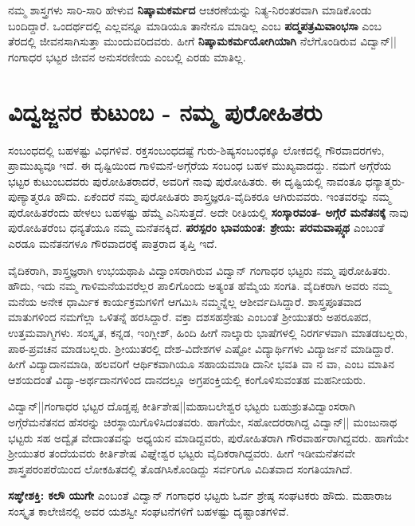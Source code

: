 ನಮ್ಮ ಶಾಸ್ತ್ರಗಳು ಸಾರಿ-ಸಾರಿ ಹೇಳುವ \textbf{ನಿಷ್ಕಾಮಕರ್ಮದ} ಆಚರಣೆಯನ್ನು ನಿತ್ಯ-ನಿರಂತರವಾಗಿ ಮಾಡಿಕೊಂಡು ಬಂದಿದ್ದಾರೆ. ಒಂದರ್ಥದಲ್ಲಿ ಎಲ್ಲವನ್ನೂ ಮಾಡಿಯೂ ತಾನೇನೂ ಮಾಡಿಲ್ಲ ಎಂಬ \textbf{ಪದ್ಮಪತ್ರಮಿವಾಂಭಸಾ} ಎಂಬ ತೆರದಲ್ಲಿ ಜೀವನಸಾಗಿಸುತ್ತಾ ಮುಂದುವರಿದವರು. ಹೀಗೆ \textbf{ನಿಷ್ಕಾಮಕರ್ಮಯೋಗಿಯಾಗಿ} ನೆಲೆಗೊಂಡಿರುವ ವಿದ್ವಾನ್||ಗಂಗಾಧರ ಭಟ್ಟರ ಜೀವನ ಅನುಸರಣೀಯ ಎಂಬಲ್ಲಿ ಎರಡು ಮಾತಿಲ್ಲ.

\section*{ವಿದ್ವಜ್ಜನರ ಕುಟುಂಬ - ನಮ್ಮ ಪುರೋಹಿತರು}

ಸಂಬಂಧದಲ್ಲಿ ಬಹಳಷ್ಟು ವಿಧಗಳಿವೆ. ರಕ್ತಸಂಬಂಧದಷ್ಟೆ ಗುರು-ಶಿಷ್ಯಸಂಬಂಧಕ್ಕೂ ಲೋಕದಲ್ಲಿ ಗೌರವಾದರಗಳು, ಪ್ರಾಮುಖ್ಯವೂ ಇದೆ. ಈ ದೃಷ್ಟಿಯಿಂದ ಗಾಳಿಮನೆ-ಅಗ್ಗೆರೆಯ ಸಂಬಂಧ ಬಹಳ ಮುಖ್ಯವಾದದ್ದು.  ನಮಗೆ ಅಗ್ಗೆರೆಯ ಭಟ್ಟರ ಕುಟುಂಬದವರು ಪುರೋಹಿತರಾದರೆ, ಅವರಿಗೆ ನಾವು ಪುರೋಹಿತರು. ಈ ದೃಷ್ಟಿಯಲ್ಲಿ ನಾವಂತೂ ಧನ್ಯಾತ್ಮರು-ಪುಣ್ಯಾತ್ಮರೂ ಹೌದು. ಏಕೆಂದರೆ ನಮ್ಮ ಪುರೋಹಿತರು ಶಾಸ್ತ್ರಜ್ಞರೂ-ವೈದಿಕರೂ ಆಗಿರುವವರು. ಇಂತವರನ್ನು ನಮ್ಮ ಪುರೋಹಿತರೆಂದು ಹೇಳಲು ಬಹಳಷ್ಟು ಹೆಮ್ಮೆ ಎನಿಸುತ್ತದೆ. ಅದೇ ರೀತಿಯಲ್ಲಿ \textbf{ಸಂಸ್ಕಾರವಂತ- ಅಗ್ಗೆರೆ ಮನೆತನಕ್ಕೆ} ನಾವು ಪುರೋಹಿತರೆಂಬ ಧನ್ಯತೆಯೂ ನಮ್ಮ ಮನೆತನಕ್ಕಿದೆ. \textbf{ಪರಸ್ಪರಂ ಭಾವಯಂತ: ಶ್ರೇಯ: ಪರಮವಾಪ್ಸ್ಯಥ}  ಎಂಬಂತೆ ಎರಡೂ ಮನೆತನಗಳೂ ಗೌರವಾದರಕ್ಕೆ ಪಾತ್ರರಾದ ತೃಪ್ತಿ ಇದೆ. 

ವೈದಿಕರಾಗಿ, ಶಾಸ್ತ್ರಜ್ಞರಾಗಿ ಉಭಯಥಾಪಿ ವಿದ್ವಾಂಸರಾಗಿರುವ ವಿದ್ವಾನ್ ಗಂಗಾಧರ ಭಟ್ಟರು ನಮ್ಮ ಪುರೋಹಿತರು. ಹೌದು, ಇದು ನಮ್ಮ ಗಾಳಿಮನೆಯವರೆಲ್ಲರ ಪಾಲಿಗೊಂದು ಅತ್ಯಂತ ಹೆಮ್ಮೆಯ ಸಂಗತಿ. ವೈದಿಕರಾಗಿ ಅವರು ನಮ್ಮ ಮನೆಯ ಅನೇಕ ಧಾರ್ಮಿಕ ಕಾರ್ಯಕ್ರಮಗಳಿಗೆ ಆಗಮಿಸಿ ನಮ್ಮನ್ನೆಲ್ಲ ಆಶೀರ್ವದಿಸಿದ್ದಾರೆ. ಶಾಸ್ತ್ರಪೂತವಾದ ಮಾತುಗಳಿಂದ ನಮಗೆಲ್ಲಾ ಒಳಿತನ್ನೆ ಹರಸಿದ್ದಾರೆ. ವಕ್ತಾ ದಶಸಹಸ್ರೇಷು ಎಂಬಂತೆ ಶ್ರೀಯುತರು ಅಪರೂಪದ, ಉತ್ತಮವಾಗ್ಮಿಗಳು. ಸಂಸ್ಕೃತ, ಕನ್ನಡ, ಇಂಗ್ಲೀಶ್, ಹಿಂದಿ ಹೀಗೆ ನಾಲ್ಕಾರು ಭಾಷೆಗಳಲ್ಲಿ ನಿರರ್ಗಳವಾಗಿ ಮಾತಡಬಲ್ಲರು, ಪಾಠ-ಪ್ರವಚನ ಮಾಡಬಲ್ಲರು. ಶ್ರೀಯುತರಲ್ಲಿ ದೇಶ-ವಿದೇಶಗಳ ಎಷ್ಟೋ ವಿದ್ಯಾರ್ಥಿಗಳು ವಿದ್ಯಾರ್ಜನೆ ಮಾಡಿದ್ದಾರೆ. ಹೀಗೆ ವಿದ್ಯಾದಾನಮಾಡಿ, ಹಲವರಿಗೆ ಆರ್ಥಿಕವಾಗಿಯೂ ಸಹಾಯಮಾಡಿ ದಾನೀ ಭವತಿ ವಾ ನ ವಾ,  ಎಂಬ ಮಾತಿನ ಆಶಯದಂತೆ ವಿದ್ಯಾ-ಅರ್ಥದಾನಗಳಿಂದ ದಾನದಲ್ಲೂ ಅಗ್ರಪಂಕ್ತಿಯಲ್ಲಿ ಕಂಗೊಳಿಸುವಂತಹ ಮಹನೀಯರು. 

ವಿದ್ವಾನ್||ಗಂಗಾಧರ ಭಟ್ಟರ ದೊಡ್ಡಪ್ಪ ಕೀರ್ತಿಶೇಷ||ಮಹಾಬಲೇಶ್ವರ ಭಟ್ಟರು ಬಹುಶ್ರುತವಿದ್ವಾಂಸರಾಗಿ ಅಗ್ಗೆರೆಮನೆತನದ ಹೆಸರನ್ನು ಚಿರಸ್ಥಾಯಿಗೊಳಿಸಿದಂತವರು. ಹಾಗೆಯೇ, ಸಹೋದರರಾಗಿದ್ದ ವಿದ್ವಾನ್|| ಮಂಜುನಾಥ ಭಟ್ಟರು ಸಹ ಅದ್ವೈತ ವೇದಾಂತವನ್ನು ಅಧ್ಯಯನ ಮಾಡಿದ್ದವರು, ಪುರೋಹಿತರಾಗಿ ಗೌರವಾರ್ಹರಾಗಿದ್ದವರು. ಹಾಗೆಯೇ ಶ್ರೀಯುತರ ತಂದೆಯವರು ಕೀರ್ತಿಶೇಷ ವಿಘ್ನೇಶ್ವರ ಭಟ್ಟರು ವೈದಿಕರಾಗಿದ್ದವರು. ಹೀಗೆ ಇಡೀಮನೆತನವೇ ಶಾಸ್ತ್ರಪರಂಪರೆಯಿಂದ ಲೋಕಹಿತದಲ್ಲಿ ತೊಡಗಿಸಿಕೊಂಡಿದ್ದು ಸರ್ವರಿಗೂ ವಿದಿತವಾದ ಸಂಗತಿಯಾಗಿದೆ. 

\textbf{ಸಙ್ಘೇಶಕ್ತಿ: ಕಲೌ ಯುಗೇ} ಎಂಬಂತೆ ವಿದ್ವಾನ್ ಗಂಗಾಧರ ಭಟ್ಟರು ಓರ್ವ ಶ್ರೇಷ್ಠ ಸಂಘಟಕರು ಹೌದು. ಮಹಾರಾಜ ಸಂಸ್ಕೃತ ಕಾಲೇಜಿನಲ್ಲಿ ಅವರ ಯಶಸ್ವೀ ಸಂಘಟನೆಗಳಿಗೆ ಬಹಳಷ್ಟು ದೃಷ್ಟಾಂತಗಳಿವೆ. 

